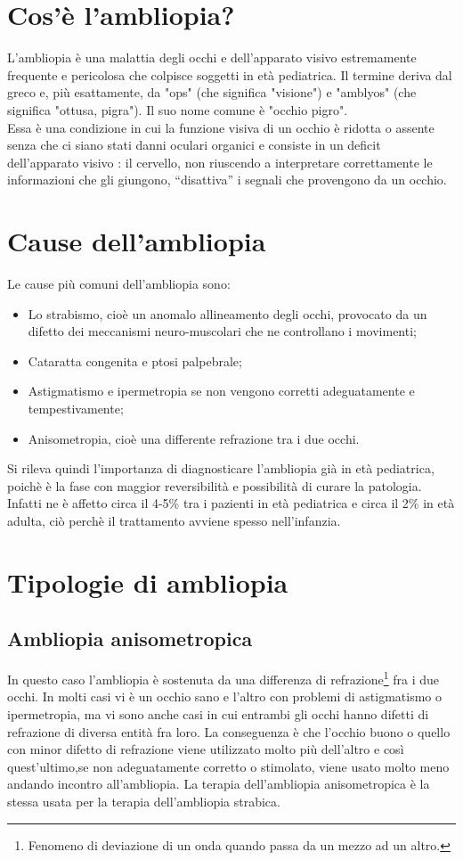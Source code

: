 \documentclass[12pt,a4paper,openright,twoside]{book}
\begin{document}
    \section{Cos'è l'ambliopia?}
    L'ambliopia è una malattia degli occhi e dell'apparato visivo estremamente frequente e pericolosa che colpisce soggetti in età pediatrica.
    Il termine deriva dal greco e, più esattamente, da "ops" (che significa "visione") e "amblyos" (che significa "ottusa, pigra"). Il suo nome comune è "occhio pigro". \cite{wiki:amb} \\ Essa è una condizione in cui la funzione visiva di un occhio è ridotta o assente senza che ci siano stati danni oculari organici e consiste in un deficit dell’apparato visivo : il cervello, non riuscendo a interpretare correttamente le informazioni che gli giungono, “disattiva” i segnali che provengono da un occhio. \cite{iapbamb} \\
    
    \section{Cause dell'ambliopia}
    Le cause più comuni dell'ambliopia sono:
    \begin{itemize}
    	\item Lo strabismo, cioè un anomalo allineamento degli occhi, provocato da un difetto dei meccanismi neuro-muscolari che ne controllano i movimenti;
    	\item Cataratta congenita e ptosi palpebrale;
    	\item Astigmatismo e ipermetropia se non vengono corretti adeguatamente e tempestivamente;
    	\item Anisometropia, cioè una differente refrazione tra i due occhi. \cite{humamb}
    \end{itemize}
	Si rileva quindi l'importanza di diagnosticare l'ambliopia già in età pediatrica, poichè è la fase con maggior reversibilità e possibilità di curare la patologia. Infatti ne è affetto circa il 4-5\% tra i pazienti in età pediatrica e circa il 2\% in età adulta, ciò 
	perchè il trattamento avviene spesso nell'infanzia.
	\section{Tipologie di ambliopia}
	\subsection{Ambliopia anisometropica}
	In questo caso l'ambliopia è sostenuta da una differenza di refrazione\footnote{Fenomeno di deviazione di un onda quando passa da un mezzo ad un altro.} fra i due occhi. In molti casi vi è un occhio sano e l'altro con problemi di astigmatismo o ipermetropia, ma vi sono anche casi in cui entrambi gli occhi hanno difetti di refrazione di diversa entità fra loro.
	La conseguenza è che l'occhio buono o quello con minor difetto di refrazione viene utilizzato molto
	più dell'altro e così quest'ultimo,se non adeguatamente corretto o stimolato, viene usato molto meno
	andando incontro all'ambliopia.
	La terapia dell'ambliopia anisometropica è la stessa usata per la terapia dell'ambliopia strabica.  \cite{strabpedr}
\end{document}
